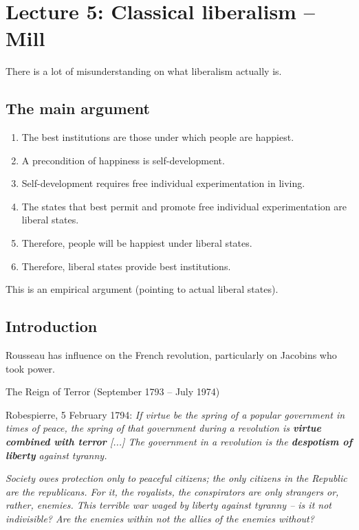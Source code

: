 
\section{Lecture 5: Classical liberalism -- Mill}

There is a lot of misunderstanding on what liberalism actually is.

\subsection{The main argument}

\begin{enumerate}
    \item The best institutions are those under which people are happiest.
    \item A precondition of happiness is self-development.
    \item Self-development requires free individual experimentation in living.
    \item The states that best permit and promote free individual
    experimentation are liberal states.
    \item Therefore, people will be happiest under liberal states.
    \item Therefore, liberal states provide best institutions.
\end{enumerate}

This is an empirical argument (pointing to actual liberal states).

\subsection{Introduction}

Rousseau has influence on the French revolution, particularly on Jacobins who
took power.

The Reign of Terror (September 1793 -- July 1974)

Robespierre, 5 February 1794: \textit{If virtue be the spring of a popular
government in times of peace, the spring of that government during a revolution
is \textbf{virtue combined with terror} [...] The government in a revolution
is the \textbf{despotism of liberty} against tyranny.}

\textit{Society owes protection only to peaceful citizens; the only citizens
in the Republic are the republicans. For it, the royalists, the conspirators
are only strangers or, rather, enemies. This terrible war waged by liberty 
against tyranny -- is it not indivisible? Are the enemies within not the
allies of the enemies without?}

